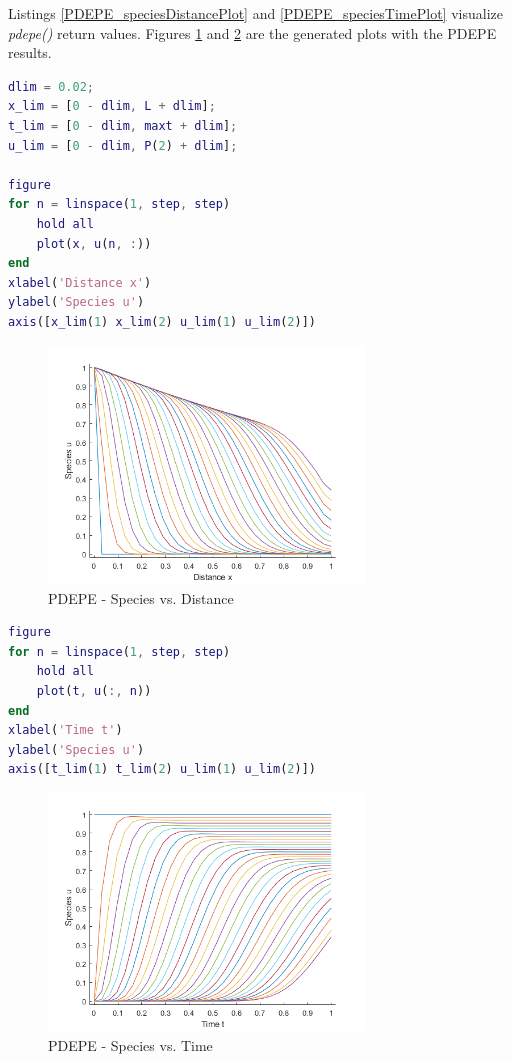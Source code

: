 \documentclass{article}
\begin{document}
Listings \ref{PDEPE_speciesDistancePlot} and \ref{PDEPE_speciesTimePlot} visualize \emph{pdepe()} return values. Figures \ref{fig_PDEPE_Species_vs_Distance} and \ref{PDEPE_Species_vs_Time} are the generated plots with the PDEPE results.

\begin{lstlisting}[language=Matlab, caption=PDEPE Distance vs. Species plot, label=PDEPE_speciesDistancePlot]
% plot limits
dlim = 0.02;
x_lim = [0 - dlim, L + dlim];
t_lim = [0 - dlim, maxt + dlim];
u_lim = [0 - dlim, P(2) + dlim];

figure
for n = linspace(1, step, step)
    hold all
    plot(x, u(n, :))
end
xlabel('Distance x')
ylabel('Species u')
axis([x_lim(1) x_lim(2) u_lim(1) u_lim(2)])
\end{lstlisting}

\begin{figure}[h!]
\centering
\includegraphics[width=0.75\textwidth]{./img/PDEPE_Species_vs_Distance.png}
\caption{PDEPE - Species vs. Distance}
\label{fig_PDEPE_Species_vs_Distance}
\end{figure}

\begin{lstlisting}[language=Matlab, caption=PDEPE Time vs. Species plot, label=PDEPE_speciesTimePlot]
figure
for n = linspace(1, step, step)
    hold all
    plot(t, u(:, n))
end
xlabel('Time t')
ylabel('Species u')
axis([t_lim(1) t_lim(2) u_lim(1) u_lim(2)])
\end{lstlisting}

\begin{figure}[h!]
\centering
\includegraphics[width=0.75\textwidth]{./img/PDEPE_Species_vs_Time.png}
\caption{PDEPE - Species vs. Time}
\label{PDEPE_Species_vs_Time}
\end{figure}
\end{document}
